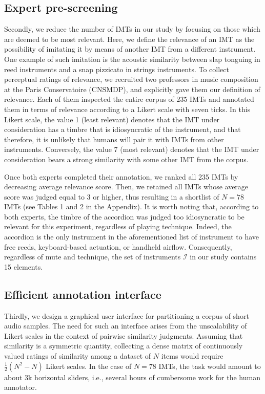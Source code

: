 \documentclass{bmcart}
\makeatletter
\newcommand*{\ie}{i.e.,\@\xspace}
\makeatother
\begin{document}
\subsection*{Expert pre-screening}
Secondly, we reduce the number of IMTs in our study by focusing on those which are deemed to be most relevant.
Here, we define the relevance of an IMT as the possibility of imitating it by means of another IMT from a different instrument.
One example of such imitation is the acoustic similarity between slap tonguing in reed instruments and a snap pizzicato in strings instruments.
To collect perceptual ratings of relevance, we recruited two professors in music composition at the Paris Conservatoire (CNSMDP), and explicitly gave them our definition of relevance.
Each of them inspected the entire corpus of $235$ IMTs and annotated them in terms of relevance according to a Likert scale with seven ticks.
In this Likert scale, the value 1 (least relevant) denotes that the IMT under consideration has a timbre that is idiosyncratic of the instrument, and that therefore, it is unlikely that humans will pair it with IMTs from other instruments.
Conversely, the value 7 (most relevant) denotes that the IMT under consideration bears a strong similarity with some other IMT from the corpus.

Once both experts completed their annotation, we ranked all 235 IMTs by decreasing average relevance score.
Then, we retained all IMTs whose average score was judged equal to 3 or higher, thus resulting in a shortlist of $N=78$ IMTs (see Tables 1 and 2 in the Appendix).
It is worth noting that, according to both experts, the timbre of the accordion was judged too idiosyncratic to be relevant for this experiment, regardless of playing technique.
Indeed, the accordion is the only instrument in the aforementioned list of
instrument to have free reeds, keyboard-based actuation, or handheld airflow.
Consequently, regardless of mute and technique, the set of instruments $\mathcal{I}$ in our study contains 15 elements.

\subsection*{Efficient annotation interface}
Thirdly, we design a graphical user interface for partitioning a corpus of short audio samples.
The need for such an interface arises from the unscalability of Likert scales in the context of pairwise similarity judgments.
Assuming that similarity is a symmetric quantity, collecting a dense matrix of continuously valued ratings of similarity among a dataset of $N$ items would require $\frac{1}{2}(N^2-N)$ Likert scales.
In the case of $N=78$ IMTs, the task would amount to about 3k horizontal sliders, \ie{} several hours of cumbersome work for the human annotator.
\end{document}
